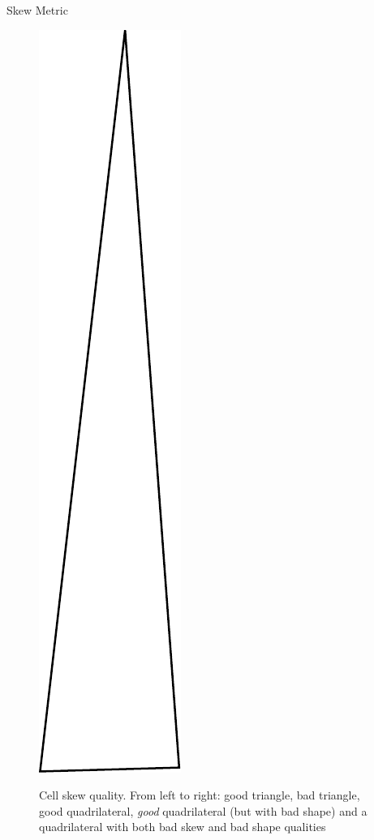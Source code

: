 \documentclass[t,12pt]{beamer}
\begin{document}
\begin{frame}{Skew Metric}
\begin{figure}
{		\includegraphics[scale=0.15]{tri_bad}
	}
	\hspace{0.2in}
	\caption{Cell skew quality. From left to right: good triangle, bad triangle, good quadrilateral, \emph{good} quadrilateral (but with bad shape) and a quadrilateral with both bad skew and bad shape qualities}
	\label{fig:skew}
\end{figure}
\end{frame}
\end{document}
